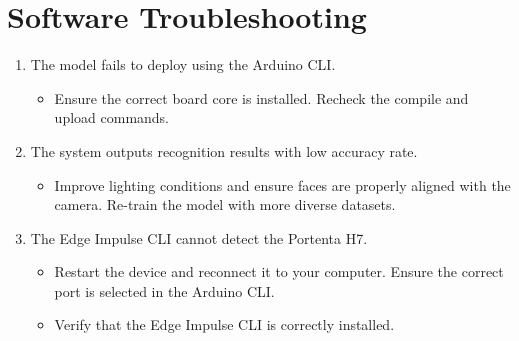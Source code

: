 \section{Software Troubleshooting}
\begin{enumerate}
	\item The model fails to deploy using the Arduino CLI. 
	\begin{itemize}
		\item Ensure the correct board core is installed. Recheck the compile and upload commands.
	\end{itemize}
	\item The system outputs recognition results with low accuracy rate.
	\begin{itemize}
		\item Improve lighting conditions and ensure faces are properly aligned with the camera. Re-train the model with more diverse datasets.
	\end{itemize}
	\item The Edge Impulse CLI cannot detect the Portenta H7.
	\begin{itemize}
		\item Restart the device and reconnect it to your computer. Ensure the correct port is selected in the Arduino CLI.
		\item Verify that the Edge Impulse CLI is correctly installed.
	\end{itemize}
\end{enumerate}




